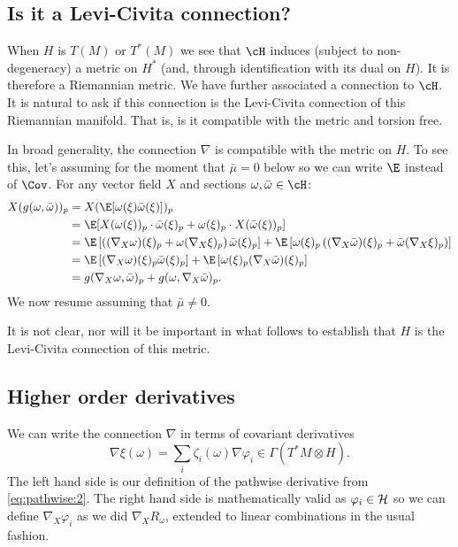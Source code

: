 \documentclass{article}
\newcommand{\randsec}{\xi}
\newcommand{\meansec}{\bar{\mu}}
\begin{document}
\subsection{Is it a Levi-Civita connection?}

When $H$ is $T(M)$ or $T^*(M)$ we see that $\cH$ induces (subject to non-degeneracy) a metric on
$H^*$ (and, through identification with its dual on $H$).
It is therefore a Riemannian metric. We have further associated a
connection to $\cH$. It is natural to ask if this connection is the Levi-Civita connection
of this Riemannian manifold. That is, is it compatible with the metric and torsion free.

In broad generality, the connection $\nabla$ is compatible with the metric on $H$.
To see this, let's assuming for the moment that $\meansec=0$ below so we can write $\E$ instead of $\Cov$.
For any vector field $X$ and sections $\omega, \bar{\omega} \in \cH$:
$$
\begin{aligned}
  X(g(\omega, \bar{\omega}))_p &= X(\E[\omega(\randsec) \bar{\omega}(\randsec)])_p \\
  &= \E[X(\omega(\randsec))_p \cdot \bar{\omega}(\randsec)_p + \omega(\randsec)_p \cdot X(\bar{\omega}(\randsec))_p] \\
&  = \E\left[\left((\nabla_X\omega)(\randsec)_p + \omega (\nabla_X\randsec)_p\right) \bar{\omega}(\randsec)_p\right] + \E\left[\omega(\randsec)_p \left((\nabla_X\bar{\omega})(\randsec)_p + \bar{\omega} (\nabla_X\randsec)_p\right) \right] \\
  &= \E\left[(\nabla_X\omega)(\randsec)_p \bar{\omega}(\randsec)_p\right] + \E\left[\omega(\randsec)_p (\nabla_X\bar{\omega})(\randsec)_p \right] \\
  &= g(\nabla_X\omega, \bar{\omega})_p + g(\omega, \nabla_X\bar{\omega})_p.
\end{aligned}
$$
We now resume assuming that $\meansec \neq 0$.

It is not clear, nor will it be important in what follows to establish that $H$ is the Levi-Civita
connection of this metric.

\subsection{Higher order derivatives}

We can write the connection $\nabla$ in terms of covariant derivatives
$$
{\nabla} \randsec(\omega) = \sum_i \zeta_i(\omega) \nabla \varphi_i \in \Gamma(T^*M \otimes H).
$$
The left hand side is our definition of the pathwise derivative from \eqref{eq:pathwise:2}.  The right
hand side is mathematically valid as $\varphi_i \in {\cal H}$ so we can define $\nabla_X \varphi_i$ as we did
$\nabla_XR_{\omega}$, extended to linear combinations in the usual fashion.
\end{document}
